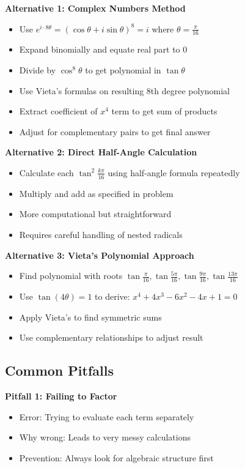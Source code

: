 \documentclass[12pt]{article}
\begin{document}
\begin{solutionbox}
\textbf{Alternative 1: Complex Numbers Method}
\begin{itemize}
    \item Use $e^{i \cdot 8\theta} = (\cos\theta + i\sin\theta)^8 = i$ where $\theta = \frac{\pi}{16}$
    \item Expand binomially and equate real part to 0
    \item Divide by $\cos^8\theta$ to get polynomial in $\tan\theta$
    \item Use Vieta's formulas on resulting 8th degree polynomial
    \item Extract coefficient of $x^4$ term to get sum of products
    \item Adjust for complementary pairs to get final answer
\end{itemize}

\textbf{Alternative 2: Direct Half-Angle Calculation}
\begin{itemize}
    \item Calculate each $\tan^2\frac{k\pi}{16}$ using half-angle formula repeatedly
    \item Multiply and add as specified in problem
    \item More computational but straightforward
    \item Requires careful handling of nested radicals
\end{itemize}

\textbf{Alternative 3: Vieta's Polynomial Approach}
\begin{itemize}
    \item Find polynomial with roots $\tan\frac{\pi}{16}, \tan\frac{5\pi}{16}, \tan\frac{9\pi}{16}, \tan\frac{13\pi}{16}$
    \item Use $\tan(4\theta) = 1$ to derive: $x^4 + 4x^3 - 6x^2 - 4x + 1 = 0$
    \item Apply Vieta's to find symmetric sums
    \item Use complementary relationships to adjust result
\end{itemize}

\subsection*{Common Pitfalls}

\textbf{Pitfall 1: Failing to Factor}
\begin{itemize}
    \item Error: Trying to evaluate each term separately
    \item Why wrong: Leads to very messy calculations
    \item Prevention: Always look for algebraic structure first
\end{itemize}


\end{solutionbox}
\end{document}
